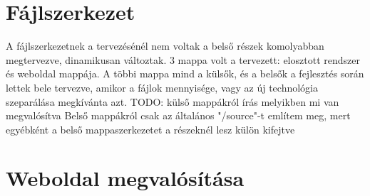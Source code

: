 \section{Fájlszerkezet}
	A fájlszerkezetnek a tervezésénél nem voltak a belső részek komolyabban megtervezve, dinamikusan változtak. 3 mappa volt a tervezett: elosztott rendszer és weboldal mappája. A többi mappa mind a külsők, és a belsők a fejlesztés során lettek bele tervezve, amikor a fájlok mennyisége, vagy az új technológia szeparálása megkívánta azt. 
	TODO: külső mappákról írás melyikben mi van megvalósítva
	Belső mappákról csak az általános "/source"-t említem meg, mert egyébként a belső mappaszerkezetet a részeknél lesz külön kifejtve

\section{Weboldal megvalósítása}
